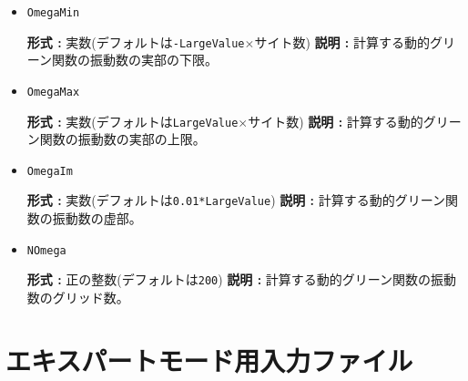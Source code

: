 \begin{itemize}
\item \verb|OmegaMin|

    {\bf 形式 :} 実数(デフォルトは\verb|-LargeValue|$\times$サイト数)
    {\bf 説明 :} 計算する動的グリーン関数の振動数の実部の下限。
    
  \item \verb|OmegaMax|

    {\bf 形式 :} 実数(デフォルトは\verb|LargeValue|$\times$サイト数)
    {\bf 説明 :} 計算する動的グリーン関数の振動数の実部の上限。

  \item \verb|OmegaIm|

    {\bf 形式 :} 実数(デフォルトは\verb|0.01*LargeValue|)
    {\bf 説明 :} 計算する動的グリーン関数の振動数の虚部。

  \item \verb|NOmega|
  
    {\bf 形式 :} 正の整数(デフォルトは\verb|200|)
    {\bf 説明 :} 計算する動的グリーン関数の振動数のグリッド数。

\end{itemize}

\newpage
\section{エキスパートモード用入力ファイル}
\label{Ch:HowToExpert}

